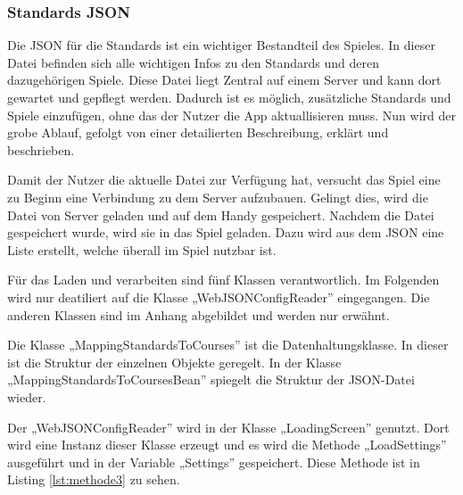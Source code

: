 			\subsubsection{Standards \ac{JSON}}
				Die \ac{JSON} für die Standards ist ein wichtiger Bestandteil des Spieles. In dieser Datei befinden sich alle wichtigen Infos zu den Standards und deren dazugehörigen Spiele. Diese Datei liegt Zentral auf einem Server und kann dort gewartet und gepflegt werden. Dadurch ist es möglich, zusätzliche Standards und Spiele einzufügen, ohne das der Nutzer die App aktuallisieren muss. Nun wird der grobe Ablauf, gefolgt von einer detailierten Beschreibung, erklärt und beschrieben.

				Damit der Nutzer die aktuelle Datei zur Verfügung hat, versucht das Spiel eine zu Beginn eine Verbindung zu dem Server aufzubauen. Gelingt dies, wird die Datei von Server geladen und auf dem Handy gespeichert. Nachdem die Datei gespeichert wurde, wird sie in das Spiel geladen. Dazu wird aus dem \ac{JSON} eine Liste erstellt, welche überall im Spiel nutzbar ist.

				Für das Laden und verarbeiten sind fünf Klassen verantwortlich. Im Folgenden wird nur deatiliert auf die Klasse „WebJSONConfigReader” eingegangen. Die anderen Klassen sind im Anhang abgebildet und werden nur erwähnt.

				Die Klasse „MappingStandardsToCourses” ist die Datenhaltungsklasse. In dieser ist die Struktur der einzelnen Objekte geregelt. In der Klasse „MappingStandardsToCoursesBean” spiegelt die Struktur der \ac{JSON}-Datei wieder. 

				Der „WebJSONConfigReader” wird in der Klasse „LoadingScreen” genutzt. Dort wird eine Instanz dieser Klasse erzeugt und es wird die Methode „LoadSettings” ausgeführt und in der Variable „Settings” gespeichert. Diese Methode ist in Listing \ref{lst:methode3} zu sehen.


